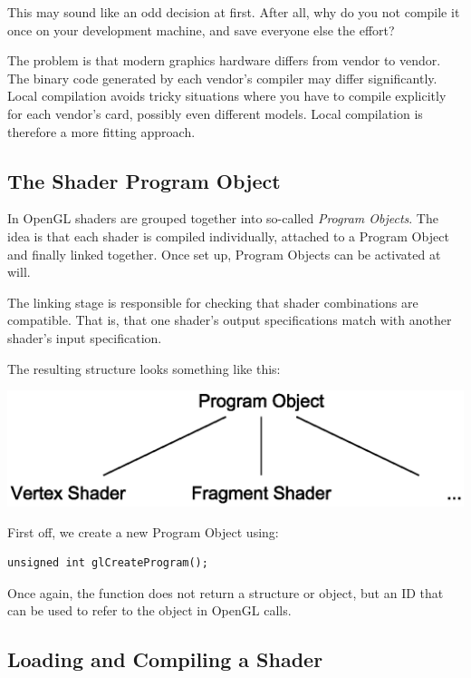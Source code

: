 This may sound like an odd decision at first. After all, why do you not compile it once on your development machine, and save everyone else the effort? 

The problem is that modern graphics hardware differs from vendor to vendor. The binary code generated by each vendor's compiler may differ significantly. Local compilation avoids tricky situations where you have to compile explicitly for each vendor's card, possibly even different models. Local compilation is therefore a more fitting approach. 

\subsection{The Shader Program Object}

In OpenGL shaders are grouped together into so-called \emph{Program Objects}. The idea is that each shader is compiled individually, attached to a Program Object and finally linked together. Once set up, Program Objects can be activated at will.

The linking stage is responsible for checking that shader combinations are compatible. That is, that one shader's output specifications match with another shader's input specification.

The resulting structure looks something like this:

\centerline {
  \includegraphics[scale=0.6]{images/openGL_program_structure.eps}
}

First off, we create a new Program Object using:

\begin{verbatim}
unsigned int glCreateProgram();
\end{verbatim}

Once again, the function does not return a structure or object, but an ID that can be used to refer to the object in OpenGL calls.

\subsection{Loading and Compiling a Shader}

